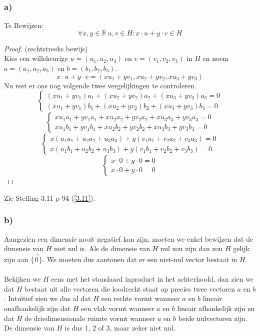 \documentclass[lineaire_algebra_oplossingen.tex]{subfiles}
\begin{document}
\subsubsection*{a)}
Te Bewijzen:\\
\[
\forall x,y \in \mathbb{R}\ u,v \in H: x\cdot u + y\cdot v \in H
\]
\begin{proof} (rechtstreeks bewijs)\\
Kies een willekeurige $u = (u_1,u_2,u_3)$ en $v = (v_1,v_2,v_3)$ in $H$ en noem $a = (a_1,a_2,a_3)$ en $b = (b_1,b_2,b_3)$.
\[
x\cdot u + y\cdot v = (xu_1 + yv_1, xu_2 + yv_2, xu_3 + yv_3)
\]
Nu rest er ons nog volgende twee vergelijkingen te controleren.
\[ 
\left\{
\begin{array}{c}
(xu_1 + yv_1)a_1 + (xu_2 + yv_2)a_2 + (xu_3 + yv_3)a_3 = 0\\
(xu_1 + yv_1)b_1 + (xu_2 + yv_2)b_2 + (xu_3 + yv_3)b_3 = 0 
\end{array}
\right.
\]
\[ 
\left\{
\begin{array}{c}
xu_1a_1 + yv_1a_1 + xu_2a_2 + yv_2a_2 + xu_3a_3 + yv_3a_3 = 0\\
xu_1b_1 + yv_1b_1 + xu_2b_2 + yv_2b_2 + xu_3b_3 + yv_3b_3 = 0 
\end{array}
\right.
\]
\[ 
\left\{
\begin{array}{c}
x(u_1a_1 + u_2a_2 + u_3a_3) + y(v_1a_1 + v_2a_2 + v_3a_3) = 0\\
x(u_1b_1 + u_2b_2 + u_3b_3) + y(v_1b_1 + v_2b_2 + v_3b_3) = 0 
\end{array}
\right.
\]
\[ 
\left\{
\begin{array}{c}
x\cdot 0 + y\cdot 0 = 0\\
x\cdot 0 + y\cdot 0 = 0 
\end{array}
\right.
\]
\end{proof}
\noindent Zie Stelling 3.11 p 94 (\ref{3.11}).

\subsubsection*{b)}
Aangezien een dimensie nooit negatief kan zijn, moeten we enkel bewijzen dat de dimensie van $H$ niet nul is. Als de dimensie van $H$ nul zou zijn dan zou $H$ gelijk zijn aan $\{\vec{0}\}$. We moeten dus aantonen dat er een niet-nul vector bestaat in $H$.\\\\
Bekijken we $H$ eens met het standaard inproduct in het achterhoofd, dan zien we dat $H$ bestaat uit alle vectoren die loodrecht staat op precies twee vectoren $a$ en $b$. Intu\"itief zien we dus al dat $H$ een rechte vormt wanneer $a$ en $b$ lineair onafhankelijk zijn dat $H$ een vlak vormt wanneer $a$ en $b$ lineair afhankelijk zijn en dat $H$ de driedimensionale ruimte vormt wanneer $a$ en $b$ beide nulvectoren zijn. De dimensie van $H$ is dus $1$, $2$ of $3$, maar zeker niet nul.
\end{document}
